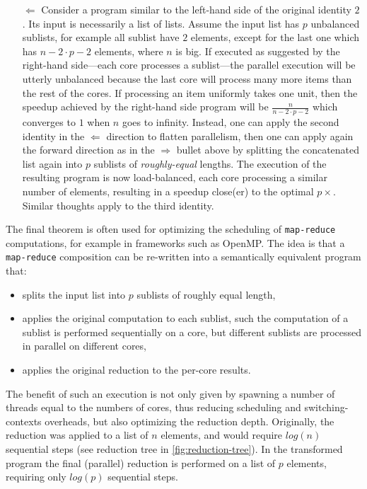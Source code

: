 \documentclass[acmsmall,review]{acmart}\settopmatter{printfolios=true,printccs=false,printacmref=false}
\begin{document}
\begin{itemize}
\begin{itemize}
            \item[$\Leftarrow$] Consider a program similar to the left-hand side
                    of the original identity $2$. Its input is necessarily a list
                    of lists. Assume the input list has $p$ unbalanced sublists, 
                    for example all sublist have $2$ elements, except for the
                    last one which has $n - 2\cdot p - 2$ elements, where 
                    $n$ is big. If executed as suggested by the right-hand side---each
                    core processes a sublist---the parallel execution will be
                    utterly unbalanced because the last core will process many
                    more items than the rest of the cores. If processing an
                    item uniformly takes one unit, then the speedup achieved 
                    by the right-hand side program will be $\frac{n}{n - 2 \cdot p - 2}$
                    which converges to $1$ when $n$ goes to infinity.
                    Instead, one can apply the second identity in the $\Leftarrow$ 
                    direction to flatten parallelism, then one can apply again 
                    the forward direction as in the $\Rightarrow$ bullet above
                    by splitting the concatenated list again into $p$ sublists 
                    of \emph{roughly-equal} lengths. The execution of the resulting
                    program is now load-balanced, each core processing a similar
                    number of elements, resulting in a speedup close(er) to
                    the optimal $p\times$. Similar thoughts apply to the third identity.
        \end{itemize}
\end{itemize}


The final theorem is often used for optimizing the scheduling of 
\lstinline{map-reduce} computations, for example in frameworks such
as OpenMP. The idea is that a \lstinline{map-reduce} composition
can be re-written into a semantically equivalent program that:
\begin{itemize}
    \item splits the input list into $p$ sublists of roughly
            equal length,
    \item applies the original computation to each sublist,
            such the computation of a sublist is performed
            sequentially on a core, but different sublists
            are processed in parallel on different cores, 
    \item applies the original reduction to the per-core
            results.
\end{itemize}
The benefit of such an execution is not only given by
spawning a number of threads equal to the numbers of cores,
thus reducing scheduling and switching-contexts overheads,
but also optimizing the reduction depth. Originally,
the reduction was applied to a list of $n$ elements,
and would require $log(n)$ sequential steps (see reduction
tree in \cref{fig:reduction-tree}). In the
transformed program the final (parallel) reduction
is performed on a list of $p$ elements, requiring only
$log(p)$ sequential steps.
\end{document}
